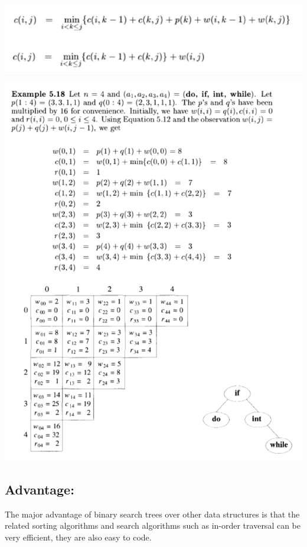 \documentclass[a4paper,12pt]{article}
\begin{document}
	\includegraphics[width=\textwidth]{obst_m1}
	
	\vspace{50px}
	\includegraphics[width=\textwidth]{obst_m2}
	\newpage
	
	\subsection{Advantage:}
	The major advantage of binary search trees over other data structures is that the related sorting algorithms and search algorithms such as in-order traversal can be very efficient, they are also easy to code. 
	\vspace{30px}
	
\end{document}
